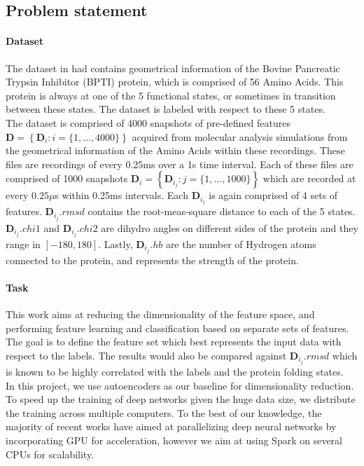 \documentclass{article}
\newcommand{\mat}[1]{\mathbf{#1}}
\begin{document}
\subsection{Problem statement}
\paragraph{Dataset} The dataset in had contains geometrical information of the Bovine Pancreatic Trypsin Inhibitor (BPTI) protein, which is comprised of 56 Amino Acids. This protein is always at one of the 5 functional states, or sometimes in transition between these states. The dataset is labeled with respect to these 5 states. \\

The dataset is comprised of 4000 snapshots of pre-defined features $\mat{D} = \left\{ \mat{D}_i : i = \{ 1, \dots, 4000\} \right\}$  acquired from molecular analysis simulations from the geometrical information of the Amino Acids within these recordings. These files are recordings of every 0.25ms over a 1s time interval. Each of these files are comprised of 1000 snapshots  $\mat{D}_i = \left\{  \mat{D}_{i_j}: j = \{ 1, \dots, 1000 \} \right\}$ which are recorded at every $0.25 \mu$s within 0.25ms intervals. Each $\mat{D}_{i_j}$ is again comprised of 4 sets of features. $\mat{D}_{i_j}.rmsd$ contains the root-meas-square distance to each of the 5 states. $\mat{D}_{i_j}.chi1$ and $\mat{D}_{i_j}.chi2$ are dihydro angles on different sides of the protein and they range in $[-180,180]$. Lastly, $\mat{D}_{i_j}.hb$ are the number of Hydrogen atoms connected to the protein, and represents the strength of the protein.


\paragraph{Task}

This work aims at reducing the dimensionality of the feature space, and performing feature learning and classification based on separate sets of features. The goal is to define the feature set which best represents the input data with respect to the labels. The results would also be compared against $\mat{D}_{i_j}.rmsd$ which is known to be highly correlated with the labels and the protein folding states.\\

In this project, we use autoencoders as our baseline for dimensionality reduction. To speed up the training of deep networks given the huge data size, we distribute the training across multiple computers. To the best of our knowledge, the majority of recent works have aimed at parallelizing deep neural networks by incorporating GPU for acceleration, however we aim at using Spark on several CPUs for scalability.
\end{document}
